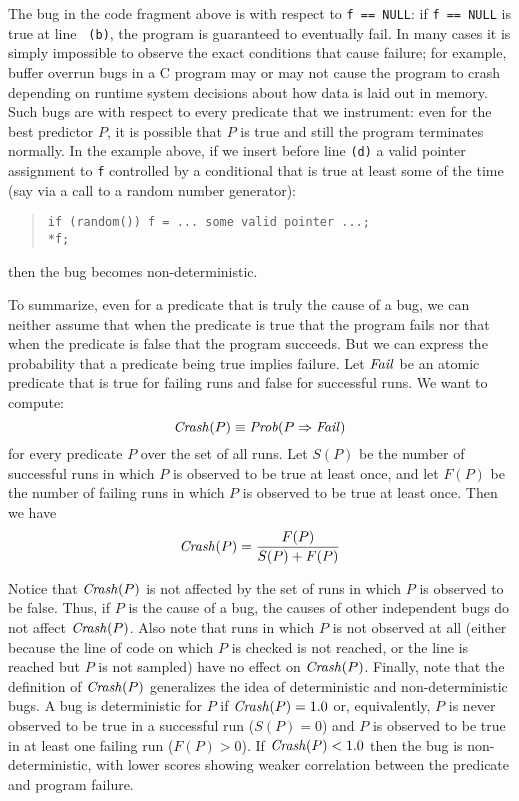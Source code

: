 The bug in the code fragment above is  with
respect to {\tt f == NULL}: if {\tt f == NULL} is true at line {\tt
(b)}, the program is guaranteed to eventually fail.  In many cases it
is simply impossible to observe the exact conditions that cause
failure; for example, buffer overrun bugs in a C program may or may
not cause the program to crash depending on runtime system decisions
about how data is laid out in memory.  Such bugs are
 with respect to every predicate that we instrument:
even for the best predictor $P$, it is possible that $P$ is true and
still the program terminates normally.  In the example above, if we insert before line
{\tt (d)} a valid pointer  assignment to {\tt f} controlled by a conditional that is true
at least some of the time (say via a call to a random number generator):
\begin{quote}
\begin{verbatim}
if (random()) f = ... some valid pointer ...;
*f;
\end{verbatim}
\end{quote}
then the bug becomes non-deterministic.

To summarize, even for a predicate that is truly the cause of a bug, we can neither assume that
when the predicate is true that
the program fails nor that when the predicate is false that
the program succeeds. But we can express the probability that a predicate
being true implies failure.  Let $\mbox{\textit{Fail}}$ be an atomic predicate that is
true for failing runs and false for successful runs.  We want to compute:
\[ \mbox{\textit{Crash}}(P) \equiv \mbox{\textit{Prob}}(P \Rightarrow \mbox{\textit{Fail}}) \]
for every predicate $P$ over the set of all runs.  Let $S(P)$ be the number
of successful runs in which $P$ is observed to be true at least once, and let $F(P)$ be the number of
failing runs in which $P$ is observed to be true at least once.  Then we have
\[ \mbox{\textit{Crash}}(P) = \frac{F(P)}{S(P) + F(P)} \]

Notice that $\mbox{\textit{Crash}}(P)$ is not affected by the set of runs in which
$P$ is observed to be false.  Thus, if $P$ is the cause of a bug, the
causes of other independent bugs do not affect $\mbox{\textit{Crash}}(P)$.
Also note that runs in which $P$ is not observed at all (either because
the line of code on which $P$ is checked is not reached, or the line is reached
but $P$ is not sampled) have no effect on $\mbox{\textit{Crash}}(P)$.
Finally, note that the definition of $\mbox{\textit{Crash}}(P)$
generalizes the idea of deterministic and non-deterministic bugs.  A
bug is deterministic for $P$ if $\mbox{\textit{Crash}}(P) = 1.0$ or, equivalently,
$P$ is never observed to be true in a successful run ($S(P) =
0$) and $P$ is observed to be true in at least one failing run ($F(P) > 0$).
If $\mbox{\textit{Crash}}(P) < 1.0$ then the bug is non-deterministic, with
lower scores showing weaker correlation between the predicate and
program failure.

